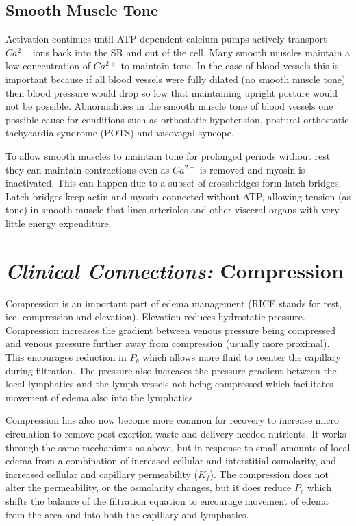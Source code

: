 \subsection{Smooth Muscle Tone}

Activation continues until ATP-dependent calcium pumps actively transport $Ca^{2+}$  ions back into the SR and out of the cell. Many smooth muscles maintain a low concentration of  $Ca^{2+}$ to maintain tone. In the case of blood vessels this is important because if all blood vessels were fully dilated (no smooth muscle tone) then blood pressure would drop so low that maintaining upright posture would not be possible. Abnormalities in the smooth muscle tone of blood vessels one possible cause for conditions such as orthostatic hypotension, postural orthostatic tachycardia syndrome (POTS) and vasovagal syncope.

To allow smooth muscles to maintain tone for prolonged periods without rest they can maintain contractions even as  $Ca^{2+}$ is removed and myosin is inactivated. This can happen due to a subset of crossbridges form latch-bridges. Latch bridges keep actin and myosin connected without ATP, allowing tension (as tone) in smooth muscle that lines arterioles and other visceral organs with very little energy expenditure.

\section{\textit{Clinical Connections:} Compression}

Compression is an important part of edema management (RICE stands for rest, ice, compression and elevation). Elevation reduces hydrostatic pressure. Compression increases the gradient between venous pressure being compressed and venous pressure further away from compression (usually more proximal). This encourages reduction in $P_c$ which allows more fluid to reenter the capillary during filtration. The pressure also increases the pressure gradient between the local lymphatics and the lymph vessels not being compressed which facilitates movement of edema also into the lymphatics.

Compression has also now become more common for recovery to increase micro circulation to remove post exertion waste and delivery needed nutrients. It works through the same mechanisms as above, but in response to small amounts of local edema from a combination of increased cellular and interstitial osmolarity, and increased cellular and capillary permeability ($K_f$). The compression does not alter the permeability, or the osmolarity changes, but it does reduce $P_c$ which shifts the balance of the filtration equation to encourage movement of edema from the area and into both the capillary and lymphatics.

